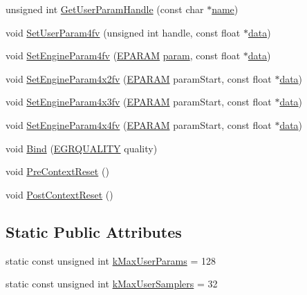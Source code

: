 \begin{CompactItemize}
\begin{CompactItemize}
\item 
unsigned int \hyperlink{class_gr_shader_43d8fd833e55e423dc8ac3d49ccc36ba}{GetUserParamHandle} (const char $\ast$\hyperlink{glext__bak_8h_bb62efe59ccdd153ce42e1a418352209}{name})
\item 
void \hyperlink{class_gr_shader_8521f7e58ccb0116d07e2c501ae06f87}{SetUserParam4fv} (unsigned int handle, const float $\ast$\hyperlink{glext__bak_8h_69926c009f2d52c6b6d2c76784af8c64}{data})
\item 
void \hyperlink{class_gr_shader_151b6e0ff7c3e9fa37c5bc2498e752fe}{SetEngineParam4fv} (\hyperlink{class_gr_shader_2f004c603bb97711d05eb68381a5a7ba}{EPARAM} \hyperlink{glext__bak_8h_c7c896d55e93a6cf7ff8524005b4e7b4}{param}, const float $\ast$\hyperlink{glext__bak_8h_69926c009f2d52c6b6d2c76784af8c64}{data})
\item 
void \hyperlink{class_gr_shader_ba8fee7b0196c1585178d3248e7cc7ca}{SetEngineParam4x2fv} (\hyperlink{class_gr_shader_2f004c603bb97711d05eb68381a5a7ba}{EPARAM} paramStart, const float $\ast$\hyperlink{glext__bak_8h_69926c009f2d52c6b6d2c76784af8c64}{data})
\item 
void \hyperlink{class_gr_shader_8566055ca06bc953e0b58f6856b07a2b}{SetEngineParam4x3fv} (\hyperlink{class_gr_shader_2f004c603bb97711d05eb68381a5a7ba}{EPARAM} paramStart, const float $\ast$\hyperlink{glext__bak_8h_69926c009f2d52c6b6d2c76784af8c64}{data})
\item 
void \hyperlink{class_gr_shader_c054492b117be764f4fd2440b7bd1020}{SetEngineParam4x4fv} (\hyperlink{class_gr_shader_2f004c603bb97711d05eb68381a5a7ba}{EPARAM} paramStart, const float $\ast$\hyperlink{glext__bak_8h_69926c009f2d52c6b6d2c76784af8c64}{data})
\item 
void \hyperlink{class_gr_shader_f32a4e5288174733e6460afac22c21c3}{Bind} (\hyperlink{enums_8h_697c1ee1354746841860d5bf9f81c033}{EGRQUALITY} quality)
\item 
void \hyperlink{class_gr_shader_2e574044a7d47d0a07d49a8a6f82fe06}{PreContextReset} ()
\item 
void \hyperlink{class_gr_shader_5a508bd00cf8c3536028294bc8f6badc}{PostContextReset} ()
\end{CompactItemize}
\subsection*{Static Public Attributes}
\begin{CompactItemize}
\item 
static const unsigned int \hyperlink{class_gr_shader_32d823afd380bcdf283ed2e667cf66cb}{kMaxUserParams} = 128
\item 
static const unsigned int \hyperlink{class_gr_shader_cbaa822de5def45617ccfb833996864e}{kMaxUserSamplers} = 32
\end{CompactItemize}



\end{CompactItemize}
